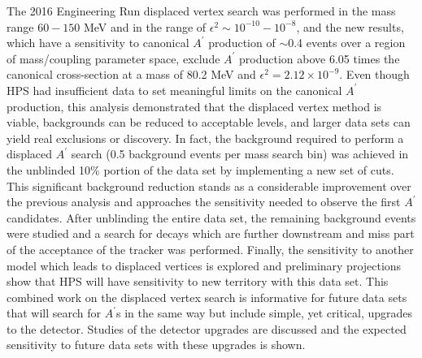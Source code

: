 \documentclass{report}
\newcommand{\aprime}{A^\prime}
\begin{document}
The 2016 Engineering Run displaced vertex search was performed in the mass range $60 - 150$ MeV and in the range of $\epsilon^2 \sim 10^{-10} - 10^{-8}$, and the new results, which have a sensitivity to canonical $\aprime$ production of $\sim$0.4 events over a region of mass/coupling parameter space, exclude $\aprime$ production above 6.05 times the canonical cross-section at a mass of 80.2 MeV and $\epsilon^2=2.12 \times 10^{-9}$. Even though HPS had insufficient data to set meaningful limits on the canonical $\aprime$ production, this analysis demonstrated that the displaced vertex method is viable, backgrounds can be reduced to acceptable levels, and larger data sets can yield real exclusions or discovery. In fact, the background required to perform a displaced $\aprime$ search (0.5 background events per mass search bin) was achieved in the unblinded 10\% portion of the data set by implementing a new set of cuts. This significant background reduction stands as a considerable improvement over the previous analysis and approaches the sensitivity needed to observe the first $\aprime$ candidates. After unblinding the entire data set, the remaining background events were studied and a search for decays which are further downstream and miss part of the acceptance of the tracker was performed. Finally, the sensitivity to another model which leads to displaced vertices is explored and preliminary projections show that HPS will have sensitivity to new territory with this data set. This combined work on the displaced vertex search is informative for future data sets that will search for $\aprime$s in the same way but include simple, yet critical, upgrades to the detector. Studies of the detector upgrades are discussed and the expected sensitivity to future data sets with these upgrades is shown.

\clearpage

\end{document}
